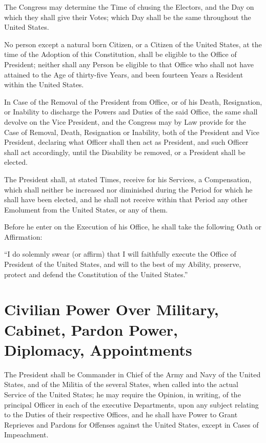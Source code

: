\documentclass{constitution}
\begin{document}
The Congress may determine the Time of chusing the Electors,
and the Day on which they shall give their Votes;
which Day shall be the same throughout the United States.

No person except a natural born Citizen,
or a Citizen of the United States, at the time of the Adoption of this Constitution,
shall be eligible to the Office of President;
neither shall any Person be eligible to that Office who shall not
have attained to the Age of thirty-five Years,
and been fourteen Years a Resident within the United States.

In Case of the Removal of the President from Office,
or of his Death, Resignation, or Inability to discharge the Powers and Duties of the said Office,
the same shall devolve on the Vice President,
and the Congress may by Law provide for the Case
of Removal, Death, Resignation or Inability,
both of the President and Vice President,
declaring what Officer shall then act as President,
and such Officer shall act accordingly,
until the Disability be removed, or a President shall be elected.

The President shall, at stated Times,
receive for his Services, a Compensation,
which shall neither be increased nor diminished
during the Period for which he shall have been elected,
and he shall not receive within that Period any other Emolument from the United States,
or any of them.

Before he enter on the Execution of his Office, he shall take the following Oath or Affirmation:

“I do solemnly swear (or affirm)
that I will faithfully execute the Office of President of the United States,
and will to the best of my Ability,
preserve, protect and defend the Constitution of the United States.”

\section{Civilian Power Over Military, Cabinet, Pardon Power, Diplomacy, Appointments}
The President shall be Commander in Chief of the Army and Navy of the United States,
and of the Militia of the several States,
when called into the actual Service of the United States;
he may require the Opinion, in writing,
of the principal Officer in each of the executive Departments,
upon any subject relating to the Duties of their respective Offices,
and he shall have Power to Grant Reprieves and Pardons for Offenses against the United States,
except in Cases of Impeachment.
\end{document}
